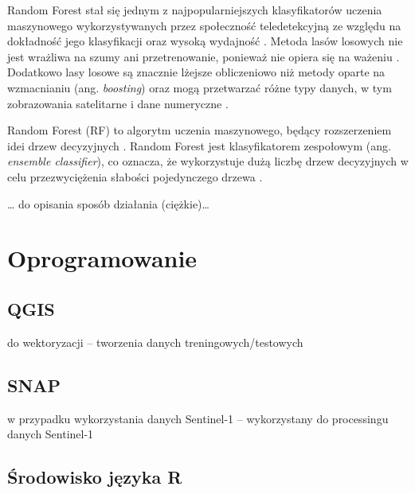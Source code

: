 \documentclass{amuthesis}
\begin{document}
Random Forest stał się jednym z najpopularniejszych klasyfikatorów
uczenia maszynowego wykorzystywanych przez społeczność teledetekcyjną ze
względu na dokładność jego klasyfikacji oraz wysoką wydajność
\autocite{belgiu_2016_rf,sheykhmousa_2020_svm_vs_rf}. Metoda lasów
losowych nie jest wrażliwa na szumy ani przetrenowanie, ponieważ nie
opiera się na ważeniu \autocite{gislason_2006_rf}. Dodatkowo lasy losowe
są znacznie lżejsze obliczeniowo niż metody oparte na wzmacnianiu (ang.
\emph{boosting}) \autocite{gislason_2006_rf} oraz mogą przetwarzać różne
typy danych, w tym zobrazowania satelitarne i dane numeryczne
\autocite{talukdar_2020_lulc}.

Random Forest (RF) to algorytm uczenia maszynowego, będący rozszerzeniem
idei drzew decyzyjnych \autocite{hejmanowska_2020_dane}. Random Forest
jest klasyfikatorem zespołowym (ang. \emph{ensemble classifier}), co
oznacza, że wykorzystuje dużą liczbę drzew decyzyjnych w celu
przezwyciężenia słabości pojedynczego drzewa \autocite{aaron_2018_ml}.

\ldots{} do opisania sposób działania (ciężkie)\ldots{}

\hypertarget{oprogramowanie}{%
\section{Oprogramowanie}\label{oprogramowanie}}

\hypertarget{qgis}{%
\subsection{QGIS}\label{qgis}}

do wektoryzacji -- tworzenia danych treningowych/testowych

\hypertarget{snap}{%
\subsection{SNAP}\label{snap}}

w przypadku wykorzystania danych Sentinel-1 -- wykorzystany do
processingu danych Sentinel-1

\hypertarget{ux15brodowisko-jux119zyka-r}{%
\subsection{Środowisko języka R}\label{ux15brodowisko-jux119zyka-r}}
\end{document}
